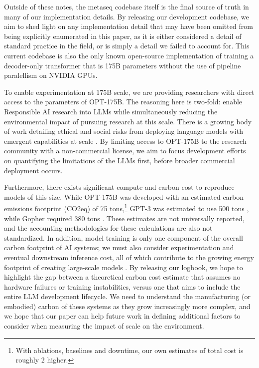 \documentclass[11pt]{article}
\newcommand{\OPT}[0]{{OPT-175B}}
\newcommand{\biggpt}[1]{{GPT-3#1}}
\begin{document}
Outside of these notes, the metaseq codebase itself is the final source of truth in many of our implementation details.  By releasing our development codebase, we aim to shed light on any implementation detail that may have been omitted from being explicitly enumerated in this paper, as it is either considered a detail of standard practice in the field, or is simply a detail we failed to account for.  This current codebase is also the only known open-source implementation of training a decoder-only transformer that is 175B parameters without the use of pipeline paralellism on NVIDIA GPUs.

To enable experimentation at 175B scale, we are providing researchers with direct access to the parameters of \OPT{}. The reasoning here is two-fold: enable Responsible AI research into LLMs while simultaneously reducing the environmental impact of pursuing research at this scale.  There is a growing body of work detailing ethical and social risks from deploying language models with emergent capabilities at scale \cite{deepmindLMrisks2021,foundation2021,dinan2021anticipating,alignmentagents2021}. By limiting access to \OPT{} to the research community with a non-commercial license, we aim to focus development efforts on quantifying the limitations of the LLMs first, before broader commercial deployment occurs.
 
Furthermore, there exists significant compute and carbon cost to reproduce models of this size.  While \OPT{} was developed with an estimated carbon emissions footprint (CO2eq) of 75 tons,\footnote{With ablations, baselines and downtime, our own estimates of total cost is roughly 2 higher.} \biggpt{} was estimated to use 500 tons \cite{patterson2021carbon}, while Gopher required 380 tons \cite{gopher2022}.  These estimates are not universally reported, and the accounting methodologies for these calculations are also not standardized. In addition, model training is only one component of the overall carbon footprint of AI systems; we must also consider experimentation and eventual downstream inference cost, all of which contribute to the growing energy footprint of creating large-scale models \cite{sustainable_ai2021}.  By releasing our logbook, we hope to highlight the gap between a theoretical carbon cost estimate that assumes no hardware failures or training instabilities, versus one that aims to include the entire LLM development lifecycle.  We need to understand the manufacturing (or embodied) carbon of these systems \cite{gupta2021chasing} as they grow increasingly more complex, and we hope that our paper can help future work in defining additional factors to consider when measuring the impact of scale on the environment.
\end{document}
